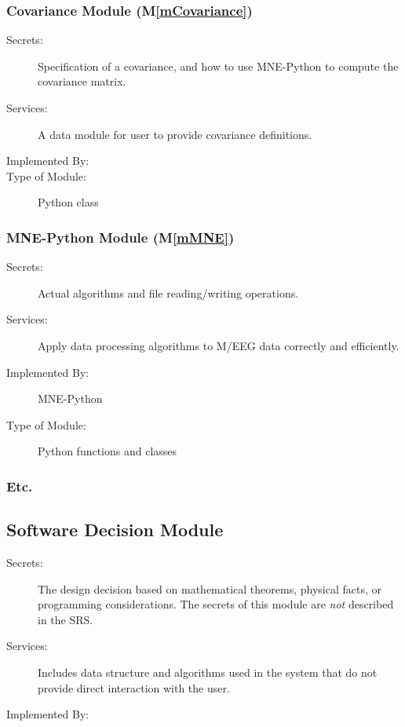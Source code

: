 \documentclass[12pt, titlepage]{article}
\newcommand{\mref}[1]{M\ref{#1}}
\begin{document}
\subsubsection{Covariance Module (\mref{mCovariance})}


\begin{description}
    \item[Secrets:] Specification of a covariance, and how to use MNE-Python to compute the covariance matrix.
    \item[Services:] A data module for user to provide covariance definitions.
    \item[Implemented By:] \progname
    \item[Type of Module:] Python class
\end{description}




\subsubsection{MNE-Python Module (\mref{mMNE})}


\begin{description}
    \item[Secrets:] Actual algorithms and file reading/writing operations.
    \item[Services:] Apply data processing algorithms to M/EEG data correctly and efficiently.
    \item[Implemented By:] MNE-Python
    \item[Type of Module:] Python functions and classes
\end{description}




\subsubsection{Etc.}




\subsection{Software Decision Module}


\begin{description}
    \item[Secrets:] The design decision based on mathematical theorems, physical facts, or programming considerations. The secrets of this module are \emph{not} described in the SRS.
    \item[Services:] Includes data structure and algorithms used in the system that do not provide direct interaction with the user. 
    \item[Implemented By:] \progname
\end{description}
\end{document}
